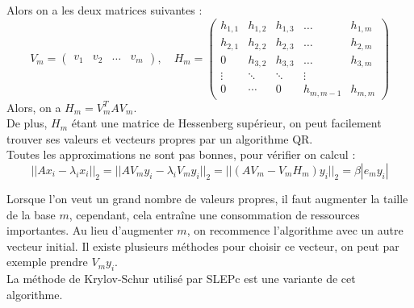 Alors on a les deux matrices suivantes :
\[ V_m = \begin{pmatrix} v_1 & v_2 & \dots & v_m \end{pmatrix},\quad H_m=\begin{pmatrix} h_{1,1} & h_{1,2} & h_{1,3} & \dots & h_{1,m}\\
h_{2,1} & h_{2,2} & h_{2,3} & \dots & h_{2,m} \\
0 & h_{3,2} & h_{3,3} & \dots & h_{3,m}\\
\vdots & \ddots & \ddots & \vdots\\
0 & \cdots & 0 & h_{m,m-1} & h_{m,m} \end{pmatrix} \]
Alors, on a $H_m=V_m^TAV_m$.\\
De plus, $H_m$ étant une matrice de Hessenberg supérieur, on peut facilement trouver ses valeurs et vecteurs propres par un algorithme QR.\\

Toutes les approximations ne sont pas bonnes, pour vérifier on calcul :
\[ ||Ax_i-\lambda_ix_i||_2 = ||AV_my_i-\lambda_iV_my_i||_2 = ||(AV_m-V_mH_m)y_i||_2 = \beta|e_my_i| \]

Lorsque l'on veut un grand nombre de valeurs propres, il faut augmenter la taille de la base $m$, cependant, cela entraîne une consommation de ressources importantes. Au lieu d'augmenter $m$, on recommence l'algorithme avec un autre vecteur initial. Il existe plusieurs méthodes pour choisir ce vecteur, on peut par exemple prendre $V_my_i$.\\

La méthode de Krylov-Schur utilisé par SLEPc est une variante de cet algorithme.

